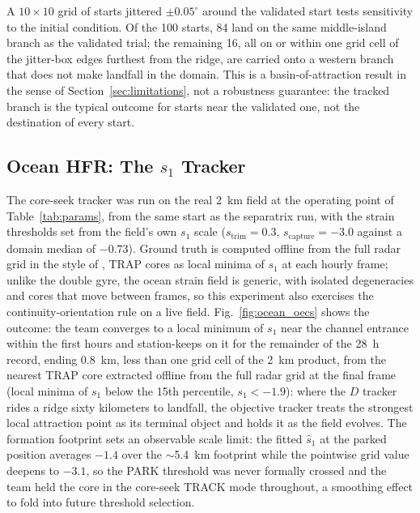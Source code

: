 \documentclass[lettersize,journal]{IEEEtran}
\begin{document}
A $10 \times 10$ grid of starts jittered $\pm 0.05^{\circ}$ around the
validated start tests sensitivity to the initial condition. Of the 100
starts, 84 land on the same middle-island branch as the validated
trial; the remaining 16, all on or within one grid cell of the
jitter-box edges furthest from the ridge, are carried onto a western
branch that does not make landfall in the domain. This is a
basin-of-attraction result in the sense of
Section~\ref{sec:limitations}, not a robustness guarantee: the tracked
branch is the typical outcome for starts near the validated one, not
the destination of every start.

\subsection{Ocean HFR: The $s_1$ Tracker}
The core-seek tracker was run on the real 2~km field at the operating
point of Table~\ref{tab:params}, from the same start as the
separatrix run, with the strain thresholds set from the field's own
$s_1$ scale ($s_{\text{trim}} = 0.3$, $s_{\text{capture}} = -3.0$
against a domain median of $-0.73$). Ground truth is computed offline
from the full radar grid in the style of \cite{17,36}, TRAP cores as
local minima of $s_1$ at each hourly frame; unlike the double gyre,
the ocean strain field is generic, with isolated degeneracies and
cores that move between frames, so this experiment also exercises the
continuity-orientation rule on a live field.
Fig.~\ref{fig:ocean_oecs} shows
the outcome: the team converges to a local minimum of
$s_1$ near the channel entrance within the first hours and
station-keeps on it for the remainder of the 28~h record, ending
0.8~km, less than one grid cell of the 2~km product, from the nearest
TRAP core extracted offline from the full radar grid at the final
frame (local minima of $s_1$ below the 15th percentile, $s_1 <
-1.9$): where the $D$ tracker rides a ridge sixty kilometers to
landfall, the objective tracker treats the strongest local attraction
point as its terminal object and holds it as the field evolves. The
formation footprint sets an observable scale limit: the fitted
$\hat{s}_1$ at the parked position averages $-1.4$ over the
$\sim$5.4~km footprint while the pointwise grid value deepens to
$-3.1$, so the PARK threshold was never formally crossed and the team
held the core in the core-seek TRACK mode throughout, a smoothing
effect to fold into future threshold selection.
\end{document}
